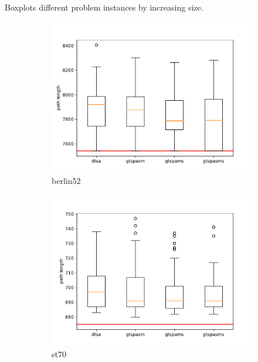 \documentclass[12pt]{article}
\theoremstyle{plain}
\theoremstyle{definition}
\theoremstyle{remark}
\begin{document}
Boxplots different problem instances by increasing size.

\begin{figure}[h]
	\centering
	\begin{subfigure}{.5\textwidth}
		\centering
		\includegraphics[width=\textwidth]{../../Implementation/gen/boxplot_berlin52}
		\caption{berlin52}
	\end{subfigure}%
	\begin{subfigure}{.5\textwidth}
		\centering
		\includegraphics[width=\textwidth]{../../Implementation/gen/boxplot_st70}
		\caption{st70}
	\end{subfigure}
	\begin{subfigure}{.5\textwidth}
		\centering

\end{subfigure}
\end{figure}
\end{document}
